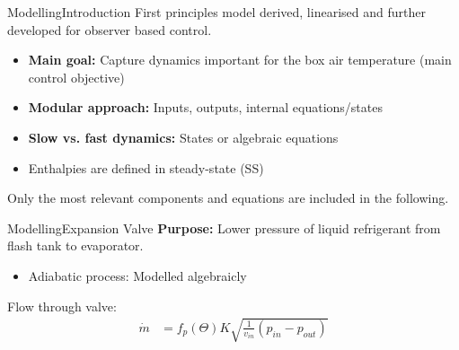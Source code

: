 \begin{frame}{Modelling}{Introduction}
	First principles model derived, linearised and further developed for observer based control.
	\begin{itemize}
		\item \textbf{Main goal:} Capture dynamics important for the box air temperature (main control objective)
		\item \textbf{Modular approach:} Inputs, outputs, internal equations/states
		\item \textbf{Slow vs. fast dynamics:} States or algebraic equations	
		\item Enthalpies are defined in steady-state (SS)
	\end{itemize}\bigskip
Only the most relevant components and equations are included in the following.
\end{frame}




%	




\begin{frame}{Modelling}{Expansion Valve}
	\textbf{Purpose:} Lower pressure of liquid refrigerant from flash tank to evaporator.
	\begin{itemize}
		\item Adiabatic process: Modelled algebraicly
	\end{itemize}
	Flow through valve:
	\begin{equation} \label{eq:ExpansionValve_Alt}
		\begin{split}
			\dot{m} & = f_p(\Theta) K  \sqrt{\frac{1}{v_{in}} (p_{in} - p_{out})} \\
		\end{split}
	\end{equation}

\end{frame}



